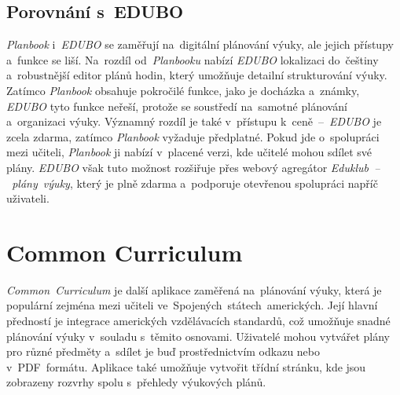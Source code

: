 \documentclass[male,czech,api_bc]{kitheses}
\begin{document}
\subsection{Porovnání s~EDUBO}  
\textit{Planbook} i~\textit{EDUBO} se zaměřují na~digitální plánování výuky, ale jejich přístupy a~funkce se liší. Na~rozdíl od~\textit{Planbooku} nabízí \textit{EDUBO} lokalizaci do~češtiny a~robustnější editor plánů hodin, který umožňuje detailní strukturování výuky. Zatímco \textit{Planbook} obsahuje pokročilé funkce, jako je docházka a~známky, \textit{EDUBO} tyto funkce neřeší, protože se soustředí na~samotné plánování a~organizaci výuky. Významný rozdíl je také v~přístupu k~ceně~--~\textit{EDUBO} je zcela zdarma, zatímco \textit{Planbook} vyžaduje předplatné. Pokud jde o~spolupráci mezi učiteli, \textit{Planbook} ji nabízí v~placené verzi, kde učitelé mohou sdílet své plány. \textit{EDUBO} však tuto možnost rozšiřuje přes webový agregátor \textit{Eduklub~--~plány~výuky}, který je plně zdarma a~podporuje otevřenou spolupráci napříč uživateli.

\section{Common Curriculum}

\textit{Common~Curriculum} je další aplikace zaměřená na~plánování výuky, která je populární zejména mezi učiteli ve~Spojených~státech~amerických. Její hlavní předností je integrace amerických vzdělávacích standardů, což umožňuje snadné plánování výuky v~souladu s~těmito osnovami. Uživatelé mohou vytvářet plány pro různé předměty a~sdílet je buď prostřednictvím odkazu nebo v~PDF~formátu. Aplikace také umožňuje vytvořit třídní stránku, kde jsou zobrazeny rozvrhy spolu s~přehledy výukových plánů.
\end{document}
